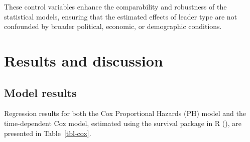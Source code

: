 \documentclass[
  12pt,
]{report}
\begin{document}
These control variables enhance the comparability and robustness of the
statistical models, ensuring that the estimated effects of leader type
are not confounded by broader political, economic, or demographic
conditions.

\section{Results and discussion}\label{results-and-discussion}

\subsection*{Model results}\label{model-results}

Regression results for both the Cox Proportional Hazards (PH) model and
the time-dependent Cox model, estimated using the survival package in R
(), are presented in
Table~\ref{tbl-cox}.
\end{document}
